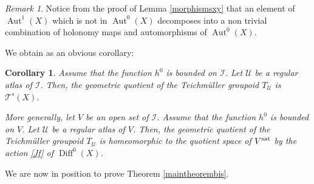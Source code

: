 \documentclass[JEP,XML,SOM,Unicode]{cedram}
\let\mathcal\mathscr
\DeclareMathOperator{\Aut}{Aut}
\DeclareMathOperator{\Diff}{Diff}
\theoremstyle{plain}
\newtheorem{corollary}[theorem]{Corollary}
\theoremstyle{definition}
\theoremstyle{remark}
\newtheorem{remark}[theorem]{Remark}
\numberwithin{equation}{section}
\newcommand{\D}{\Diff^0(X)}
\newcommand{\cI}{\mathcal{I}}
\begin{document}
\begin{remark}
\label{Aut10}
Notice from the proof of Lemma \ref{morphismsxy} that an element of $\Aut^1(X)$ which is not in $\Aut^0(X)$ decomposes into a non trivial combination of holonomy maps and automorphisms of $\Aut^0(X)$.
\end{remark}

We obtain as an obvious corollary:

\begin{corollary}
\label{geoquotient}
Assume that the function $h^0$ is bounded on $\cI$. Let $\mathcal U$ be a regular atlas of $\cI$. Then, the geometric quotient of the Teichmüller groupoid $T_{\mathcal U}$ is $\mathcal T^s(X)$.

More generally, let $V$ be an open set of $\cI$. Assume that the function $h^0$ is bounded on $V$. Let $\mathcal U$ be a regular atlas of $V$. Then, the geometric quotient of the Teichmüller groupoid $T_{\mathcal U}$ is homeomorphic to the quotient space of $V^{\textup{sat}}$ by the action \eqref{Jf} of $\D$.
\end{corollary}

We are now in position to prove Theorem \ref{maintheorembis}.
\end{document}
